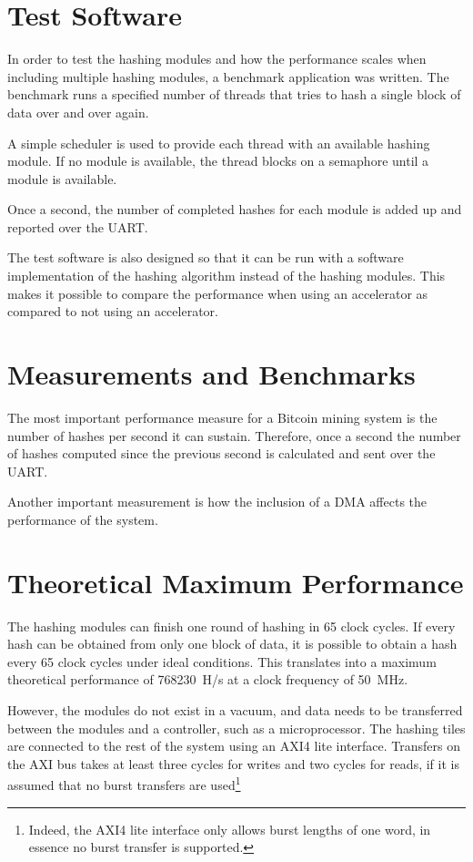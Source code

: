 \section{Test Software}
In order to test the hashing modules and how the performance scales when including
multiple hashing modules, a benchmark application was written. The benchmark
runs a specified number of threads that tries to hash a single block of data
over and over again.

A simple scheduler is used to provide each thread with an available hashing module.
If no module is available, the thread blocks on a semaphore until a module is available.

Once a second, the number of completed hashes for each module is added up and
reported over the UART.

The test software is also designed so that it can be run with a software implementation
of the hashing algorithm instead of the hashing modules. This makes it possible
to compare the performance when using an accelerator as compared to not using
an accelerator.

\section{Measurements and Benchmarks}
The most important performance measure for a Bitcoin mining system is the number
of hashes per second it can sustain. Therefore, once a second the number of hashes
computed since the previous second is calculated and sent over the UART.

Another important measurement is how the inclusion of a DMA affects the performance
of the system.

\section{Theoretical Maximum Performance} %

The hashing modules can finish one round of hashing in 65 clock cycles. If
every hash can be obtained from only one block of data, it is possible to
obtain a hash every 65 clock cycles under ideal conditions. This translates
into a maximum theoretical performance of 768230~H/s at a clock frequency of
50~MHz.

However, the modules do not exist in a vacuum, and data needs to be transferred
between the modules and a controller, such as a microprocessor. The hashing tiles
are connected to the rest of the system using an AXI4 lite interface. Transfers
on the AXI bus takes at least three cycles for writes and two cycles for reads,
if it is assumed that no burst transfers are used\footnote{Indeed, the AXI4 lite
interface only allows burst lengths of one word, in essence no burst transfer is
supported.}

